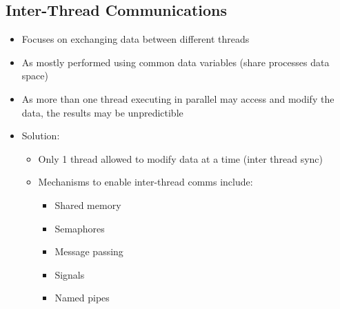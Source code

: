 \subsection{Inter-Thread Communications}

\begin{itemize}
	\item Focuses on exchanging data between different threads
	\item As mostly performed using common data variables (share processes
		data space)
	\item As more than one thread executing in parallel may access and
		modify the data, the results may be unpredictible
	\item Solution:
	\begin{itemize}
		\item Only 1 thread allowed to modify data at a time (inter
			thread sync)
		\item Mechanisms to enable inter-thread comms include:
		\begin{itemize}
			\item Shared memory
			\item Semaphores
			\item Message passing
			\item Signals
			\item Named pipes
		\end{itemize}
	\end{itemize}
\end{itemize}
